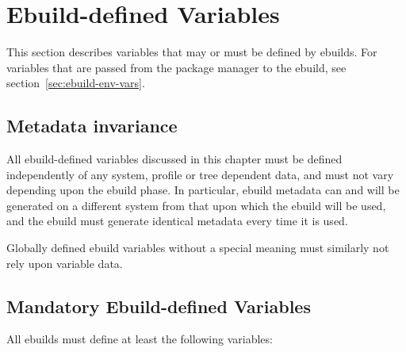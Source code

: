 \chapter{Ebuild-defined Variables}
\label{sec:ebuild-vars}

\note This section describes variables that may or must be defined by ebuilds. For
variables that are passed from the package manager to the ebuild, see section~\ref{sec:ebuild-env-vars}.

\section{Metadata invariance}
\label{sec:metadata-invariance}

All ebuild-defined variables discussed in this chapter must be defined independently of
any system, profile or tree dependent data, and must not vary depending upon the ebuild
phase. In particular, ebuild metadata can and will be generated on a different system from that upon
which the ebuild will be used, and the ebuild must generate identical metadata every time it
is used.

Globally defined ebuild variables without a special meaning must similarly not rely upon
variable data.

\section{Mandatory Ebuild-defined Variables}

All ebuilds must define at least the following variables:

